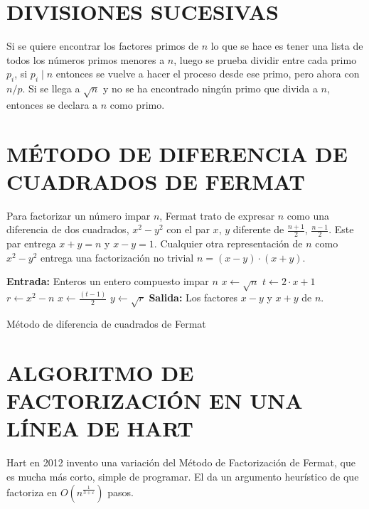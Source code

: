     \section{DIVISIONES SUCESIVAS}
    Si se quiere encontrar los factores primos de $n$ lo que se hace es tener una lista de todos los números primos menores a $n$, luego se prueba dividir  entre cada primo $p_{i}$, si $p_{i} \mid n$ entonces se vuelve a hacer el proceso desde ese primo, pero ahora con $n/p$. Si se llega a $\sqrt{n}$ y no se ha encontrado ningún primo que divida a $n$, entonces se declara a $n$ como primo. \citep{Knuth1976}

    \section{MÉTODO DE DIFERENCIA DE CUADRADOS DE FERMAT}
    Para factorizar un número impar $n$, Fermat trato de expresar $n$ como una diferencia de dos cuadrados, $x^{2}-y^{2}$ con el par $x$, $y$ diferente de $\frac{n+1}{2}$, $\frac{n-1}{2}$. Este par entrega $x + y = n$ y $x - y =1$. Cualquier otra representación de $n$ como $x^{2}-y^{2}$ entrega una factorización no trivial $n = (x - y)\cdot (x + y)$. \citep{Fermat1894}

    \begin{algorithm}[H]
        \SetAlgoLined
        \textbf{Entrada:} Enteros un entero compuesto impar $n$ \;
        $x \leftarrow \sqrt{n}$\;
        $t \leftarrow 2\cdot x + 1$\;
        $r \leftarrow x^{2} - n $\;
        $x \leftarrow \frac{(t - 1)}{2}$\;
        $y \leftarrow \sqrt{r}$\;
        \textbf{Salida:} Los factores $x-y$ y $x+y$ de $n$.\ 
        \caption{Método de diferencia de cuadrados de Fermat}
    \end{algorithm}

    \section{ALGORITMO DE FACTORIZACIÓN EN UNA LÍNEA DE HART}
    Hart en 2012 invento una variación del Método de Factorización de Fermat, que es mucha más corto, simple de programar. El da un argumento heurístico de que factoriza  en $O(n^{\frac{1}{3+ \varepsilon}})$ pasos.
    
